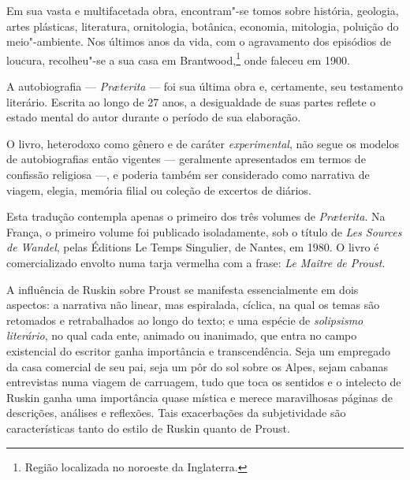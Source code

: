 Em sua vasta e multifacetada obra, encontram"-se tomos sobre história,
geologia, artes plásticas, literatura, ornitologia, botânica, economia,
mitologia, poluição do meio"-ambiente. Nos últimos anos da vida, com o
agravamento dos episódios de loucura, recolheu"-se a sua casa em
Brantwood,\footnote{Região localizada no noroeste da Inglaterra.} onde faleceu em 1900.

A autobiografia --- \textit{Pr\ae terita} --- foi sua última obra e,
certamente, seu testamento literário. Escrita ao longo de 27 anos, a
desigualdade de suas partes reflete o estado mental do autor durante o
período de sua elaboração.

O livro, heterodoxo como gênero e de caráter \textit{experimental}, não segue
os modelos de autobiografias então vigentes --- geralmente apresentados
em termos de confissão religiosa ---, e poderia também ser considerado
como narrativa de viagem, elegia, memória filial ou coleção de excertos
de diários.

Esta tradução contempla apenas o primeiro dos três volumes de
\textit{Pr\ae terita}. Na França, o primeiro volume foi publicado
isoladamente, sob o título de \textit{Les Sources de Wandel}, pelas Éditions Le
Temps Singulier, de Nantes, em 1980. O livro é comercializado envolto numa
tarja vermelha com a frase: \textit{Le Maître de Proust}.


A influência de Ruskin sobre Proust se manifesta essencialmente em dois
aspectos: a narrativa não linear, mas espiralada, cíclica, na qual os
temas são retomados e retrabalhados ao longo do texto; e uma espécie de
\textit{solipsismo literário}, no qual cada ente, animado ou inanimado, que
entra no campo existencial do escritor ganha importância e
transcendência. Seja um empregado da casa comercial de seu pai, seja um
pôr do sol sobre os Alpes, sejam cabanas entrevistas numa viagem de
carruagem, tudo que toca os sentidos e o intelecto de Ruskin ganha uma
importância quase mística e merece maravilhosas páginas de descrições,
análises e reflexões. Tais exacerbações da subjetividade são
características tanto do estilo de Ruskin quanto de Proust.

\enlargethispage{\baselineskip}

